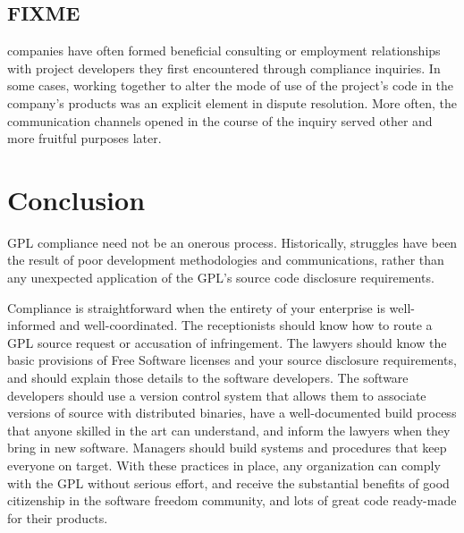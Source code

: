 


\section{FIXME}

companies have often formed beneficial consulting or employment relationships
with project developers they first encountered through compliance
inquiries. In some cases, working together to alter the mode of use of the
project’s code in the company’s products was an explicit element in dispute
resolution. More often, the communication channels opened in the course of
the inquiry served other and more fruitful purposes later.


\chapter{Conclusion}

GPL compliance need not be an onerous process.  Historically, struggles
have been the result of poor development methodologies and communications,
rather than any unexpected application of the GPL's source code disclosure
requirements.

Compliance is straightforward when the entirety of your enterprise is
well-informed and well-coordinated.  The receptionists should know how to
route a GPL source request or accusation of infringement.  The lawyers
should know the basic provisions of Free Software licenses and your source
disclosure requirements, and should explain those details to the software
developers.  The software developers should use a version control system
that allows them to associate versions of source with distributed
binaries, have a well-documented build process that anyone skilled in the
art can understand, and inform the lawyers when they bring in new
software.  Managers should build systems and procedures that keep everyone
on target.  With these practices in place, any organization can comply
with the GPL without serious effort, and receive the substantial benefits
of good citizenship in the software freedom community, and lots of great code
ready-made for their products.

\vfill

